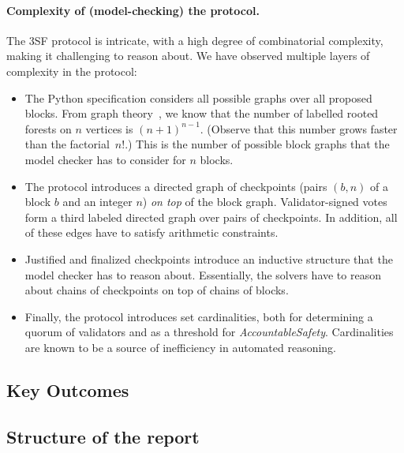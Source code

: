 \paragraph{Complexity of (model-checking) the protocol.} The 3SF protocol is
intricate, with a high degree of combinatorial complexity, making it challenging
to reason about. We have observed multiple layers of complexity in the protocol:
\begin{itemize}
  \item The Python specification considers all possible graphs over all proposed
    blocks. From graph theory~\cite{cayley1878theorem}, we know that the number
    of labelled rooted forests on $n$ vertices is ${(n+1)}^{n-1}$. (Observe that
    this number grows faster than the factorial~$n!$.) This is the number of
    possible block graphs that the model checker has to consider for $n$ blocks.
  \item The protocol introduces a directed graph of checkpoints (pairs $(b,n)$
    of a block $b$ and an integer $n$) \emph{on top} of the block graph.
    Validator-signed votes form a third labeled directed graph over pairs of
    checkpoints. In addition, all of these edges have to satisfy arithmetic
    constraints.
  \item Justified and finalized checkpoints introduce an inductive structure
    that the model checker has to reason about. Essentially, the solvers have to
    reason about chains of checkpoints on top of chains of blocks.
  \item Finally, the protocol introduces set cardinalities, both for determining a
    quorum of validators and as a threshold for \textit{AccountableSafety}.
    Cardinalities are known to be a source of inefficiency in automated
    reasoning.
\end{itemize}

\subsection{Key Outcomes}\label{sec:discussion}



\subsection{Structure of the report}

